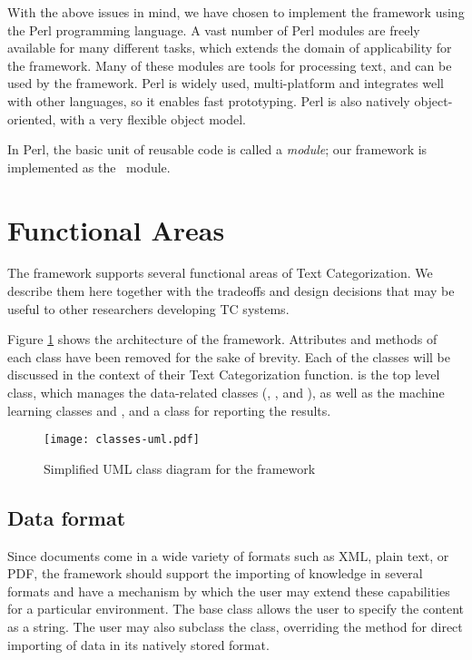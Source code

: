 \begin{singlespace}
With the above issues in mind, we have chosen to implement the
framework using the Perl programming language. \cite{Wall:00} A vast
number of Perl modules are freely available for many different tasks,
which extends the domain of applicability for the framework. Many of
these modules are tools for processing text, and can be used by the
framework. Perl is widely used, multi-platform and integrates well
with other languages, so it enables fast prototyping. Perl is also
natively object-oriented, with a very flexible object
model.\cite{conway:99}

In Perl, the basic unit of reusable code is called a \emph{module};
our framework is implemented as the \aicat\ module.

\section{Functional Areas}

The framework supports several functional areas of Text
Categorization. We describe them here together with the tradeoffs and
design decisions that may be useful to other researchers developing TC
systems.

Figure \ref{classes-uml} shows the architecture of the
framework. Attributes and methods of each class have been removed for
the sake of brevity. Each of the classes will be discussed in the
context of their Text Categorization function.  is
the top level class, which manages the data-related classes
(, ,  and
), as well as the machine learning 
classes and , and a class for reporting the
results.


\begin{figure}
\texttt{[image: classes-uml.pdf]}
\caption{Simplified UML class diagram for the framework}
\label{classes-uml}
\end{figure}

\subsection*{Data format}
Since documents come in a wide variety of formats such as XML, plain text,
or PDF, the framework should support the
importing of knowledge in several formats and have a mechanism by
which the user may extend these capabilities for a particular
environment.  The base class  allows the user to
specify the content as a string.  The user may also subclass the
 class, overriding the  method for
direct importing of data in its natively stored format.


\end{singlespace}

